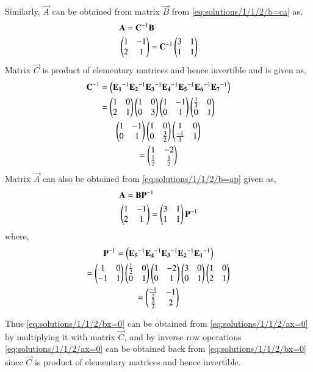 Similarly, $\vec{A}$ can be obtained from matrix $\vec{B}$ from \eqref{eq:solutions/1/1/2/b=ca} as, 
\begin{align}
    &\mathbf{A} = \mathbf{C}^{-1}\mathbf{B}\label{eq:solutions/1/1/2/a=c-1b}\\
    &\begin{pmatrix}1&-1\\2&1\end{pmatrix} = \mathbf{C}^{-1}\begin{pmatrix}3&1\\1&1\end{pmatrix} \label{eq:solutions/1/1/2/eq:c-1b}
\end{align}
Matrix $\vec{C}$ is product of elementary matrices and hence invertible and is given as,
\begin{multline}
    \mathbf{C}^{-1} = \left(\mathbf{E_1}^{-1}\mathbf{E_2}^{-1}\mathbf{E_3}^{-1}\mathbf{E_4}^{-1}
    \mathbf{E_5}^{-1}\mathbf{E_6}^{-1}\mathbf{E_7}^{-1}\right) \\
    =\begin{pmatrix}1&0\\2&1\end{pmatrix}\begin{pmatrix}1&0\\0&3\end{pmatrix}\begin{pmatrix}1&-1\\0&1\end{pmatrix}\begin{pmatrix}\frac{1}{3}&0\\0&1\end{pmatrix}\\
    \begin{pmatrix}1&-1\\0&1\end{pmatrix}\begin{pmatrix}1&0\\0&\frac{3}{2}\end{pmatrix}\begin{pmatrix}1&0\\ \frac{-1}{3}&1\end{pmatrix}\\
    =\begin{pmatrix}1&-2\\ \frac{1}{2}&\frac{1}{2}\end{pmatrix}
\end{multline}
Matrix $\vec{A}$ can also be obtained from \eqref{eq:solutions/1/1/2/b=ap} given as, 
\begin{align}
    &\mathbf{A} = \mathbf{B}\mathbf{P}^{-1} \\
    &\begin{pmatrix}1&-1\\2&1\end{pmatrix} = \begin{pmatrix}3&1\\1&1\end{pmatrix}\mathbf{P}^{-1}
\end{align}
where, 
\begin{multline}
    \mathbf{P}^{-1} = \left(\mathbf{E_5}^{-1}\mathbf{E_4}^{-1}\mathbf{E_3}^{-1}\mathbf{E_2}^{-1}\mathbf{E_1}^{-1}\right) \\
    = \begin{pmatrix}1&0\\-1&1\end{pmatrix}\begin{pmatrix}\frac{1}{2}&0\\0&1\end{pmatrix}\begin{pmatrix}1&-2\\0&1\end{pmatrix}\begin{pmatrix}3&0\\0&1\end{pmatrix}\begin{pmatrix}1&0\\2&1\end{pmatrix} \\
    =\begin{pmatrix}\frac{-1}{2}&-1\\ \frac{5}{2}&2\end{pmatrix}
\end{multline}

Thus \eqref{eq:solutions/1/1/2/bx=0} can be obtained from \eqref{eq:solutions/1/1/2/ax=0} by multiplying it with matrix $\vec{C}$, and by inverse row operations \eqref{eq:solutions/1/1/2/ax=0} can be obtained back from \eqref{eq:solutions/1/1/2/bx=0} since $\vec{C}$ is product of elementary matrices and hence invertible. 

